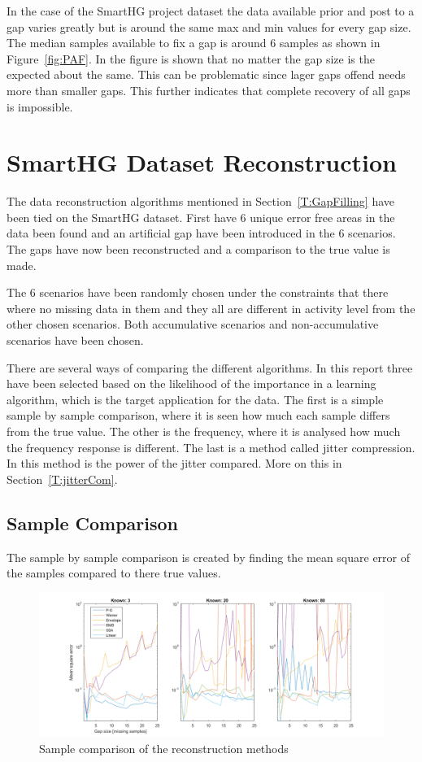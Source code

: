 In the case of the SmartHG project dataset the data available prior and post to a gap varies greatly but is around the same max and min values for every gap size. The median samples available to fix a gap is around 6 samples as shown in Figure~\ref{fig:PAF}. In the figure is shown that no matter the gap size is the expected  about the same. This can be problematic since lager gaps offend needs more  than smaller gaps. This further indicates that complete recovery of all gaps is impossible. 

\newpage

\section{SmartHG Dataset Reconstruction}
The data reconstruction algorithms mentioned in Section~\ref{T:GapFilling} have been tied on the SmartHG dataset. First have 6 unique error free areas in the data been found and an artificial gap have been introduced in the 6 scenarios. 
The gaps have now been reconstructed and a comparison to the true value is made. 

The 6 scenarios have been randomly chosen under the constraints that there where no missing data in them and they all are different in activity level from the other chosen scenarios. Both accumulative scenarios and non-accumulative scenarios have been chosen. 

There are several ways of comparing the different algorithms. In this report three have been selected based on the likelihood of the importance in a learning algorithm, which is the target application for the data. The first is a simple sample by sample comparison, where it is seen how much each sample differs from the true value. The other is the frequency, where it is analysed how much the frequency response is different. The last is a method called jitter compression. In this method is the power of the jitter compared. More on this in Section~\ref{T:jitterCom}.

\subsection{Sample Comparison}
The sample by sample comparison is created by finding the mean square error of the samples compared to there true values.  

\begin{figure}[H]
\centering
\includegraphics[width=1\textwidth]{billeder/RecNorm.png}
\caption{Sample comparison of the reconstruction methods}
\label{fig:RecNorm}
\end{figure}

